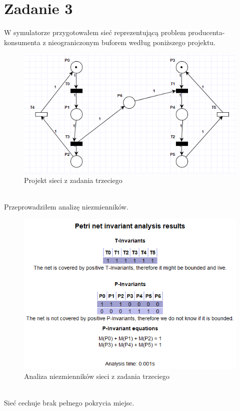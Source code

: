 \documentclass{article}
\begin{document}
    \section{Zadanie 3}
        W symulatorze przygotowałem sieć reprezentującą problem producenta-konsumenta z nieograniczonym buforem według poniższego projektu.
        \begin{figure}[h!]
            \centering
            \includegraphics[width=14cm]{lab6/n3.png}
            \caption{Projekt sieci z zadania trzeciego}
        \end{figure}\\
        \FloatBarrier
        Przeprowadziłem analizę niezmienników. 
        \begin{figure}[h!]
            \centering
            \includegraphics[width=15cm]{lab6/n3_1.png}
            \caption{Analiza niezmienników sieci z zadania trzeciego}
        \end{figure}\\
        \FloatBarrier
        Sieć cechuje brak pełnego pokrycia miejsc. 
    
\end{document}
